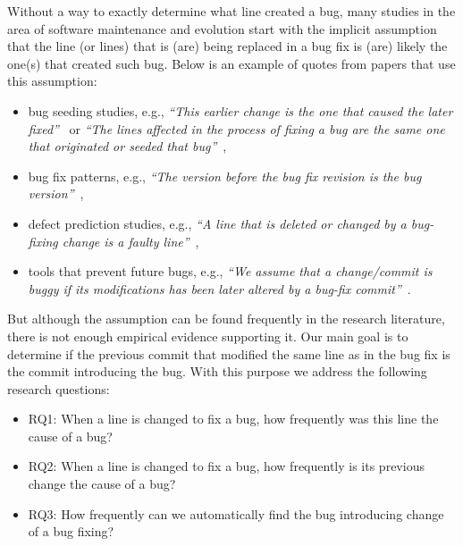 \documentclass[conference]{IEEEtran}
\begin{document}
Without a way to exactly determine what line created a bug, many studies in the area of software maintenance and evolution start with the implicit assumption that the line (or lines) that is (are) being replaced in a bug fix is (are) likely the one(s) that created such bug.
Below is an example of quotes from papers that use this assumption:

\begin{itemize}
\item bug seeding studies, e.g., \textit{``This earlier change is the one that caused the later
    fixed''}~\cite{williams2008szz} or \textit{``The lines affected in the process of fixing a bug are the same one that
    originated or seeded that bug''}~\cite{izquierdo2011developers},
\item bug fix patterns, e.g., \textit{``The version before the bug fix revision is the bug
    version''}~\cite{pan2009toward},
\item defect prediction studies, e.g., \textit{``A line that is deleted or changed by a bug-fixing change is a faulty
    line''}~\cite{altman1968financial},
\item tools that prevent future bugs, e.g., \textit{``We assume that a change/commit is buggy if its modifications has
    been later altered by a bug-fix commit''}~\cite{fejzer2015supporting}.
\end{itemize}

But although the assumption can be found frequently in the research literature, there is not enough empirical evidence supporting it.
Our main goal is to determine if the previous commit that modified the same line as in the bug fix is the commit introducing the bug.
With this purpose we address the following research questions: 

\begin{itemize}
	\item RQ1: When a line is changed to fix a bug, how frequently was this line the cause of a bug?
	\item RQ2: When a line is changed to fix a bug, how frequently is its previous change the cause of a bug?
	\item RQ3: How frequently can we automatically find the bug introducing change of a bug fixing?
\end{itemize}
\end{document}
